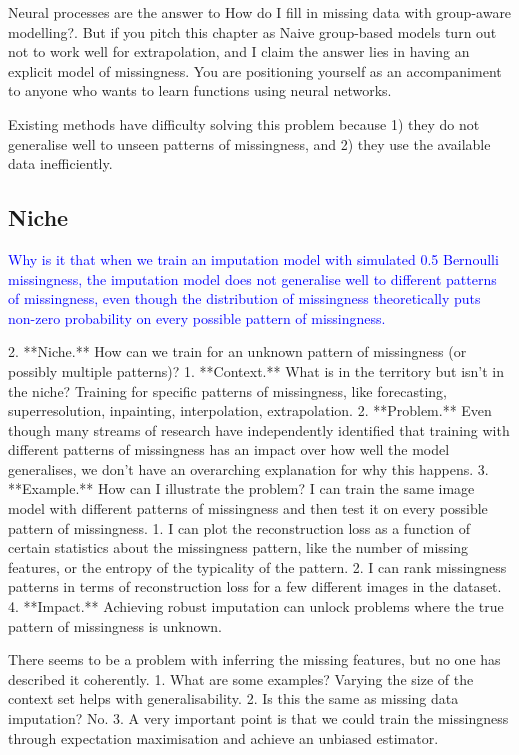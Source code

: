 \documentclass[a4paper,12pt,twoside,openright]{article}
\newcommand{\draft}[1]{\textcolor{blue}{#1}}
\begin{document}
Neural processes are the answer to How do I fill in missing data with group-aware modelling?. But if you pitch this chapter as Naive group-based models turn out not to work well for extrapolation, and I claim the answer lies in having an explicit model of missingness. You are positioning yourself as an accompaniment to anyone who wants to learn functions using neural networks.

Existing methods have difficulty solving this problem because 1) they do not generalise well to unseen patterns of missingness, and 2) they use the available data inefficiently.

\subsection{Niche}

\draft{Why is it that when we train an imputation model with simulated 0.5 Bernoulli missingness, the imputation model does not generalise well to different patterns of missingness, even though the distribution of missingness theoretically puts non-zero probability on every possible pattern of missingness.}

2. **Niche.** How can we train for an unknown pattern of missingness (or possibly multiple patterns)?
   1. **Context.** What is in the territory but isn't in the niche? Training for specific patterns of missingness, like forecasting, superresolution, inpainting, interpolation, extrapolation.
   2. **Problem.** Even though many streams of research have independently identified that training with different patterns of missingness has an impact over how well the model generalises, we don't have an overarching explanation for why this happens.
   3. **Example.** How can I illustrate the problem? I can train the same image model with different patterns of missingness and then test it on every possible pattern of missingness. 
      1. I can plot the reconstruction loss as a function of certain statistics about the missingness pattern, like the number of missing features, or the entropy of the typicality of the pattern.
      2. I can rank missingness patterns in terms of reconstruction loss for a few different images in the dataset.
   4. **Impact.** Achieving robust imputation can unlock problems where the true pattern of missingness is unknown.

There seems to be a problem with inferring the missing features, but no one has described it coherently.
   1. What are some examples? Varying the size of the context set helps with generalisability. 
   2. Is this the same as missing data imputation? No.
   3. A very important point is that we could train the missingness through expectation maximisation and achieve an unbiased estimator.
\end{document}
